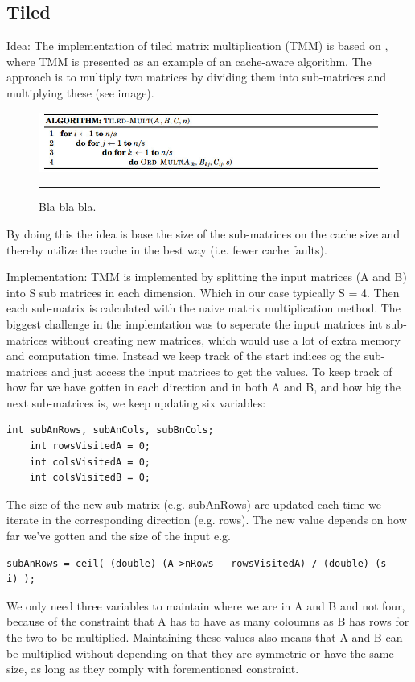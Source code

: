 \subsection{Tiled}
Idea:
The implementation of tiled matrix multiplication (TMM) is based on \citep{matrixMultiplication}, where TMM is presented as an example of an cache-aware algorithm. 
The approach is to multiply two matrices by dividing them into sub-matrices and multiplying these (see image). 
\begin{figure}[htbp]
	\centering
		\includegraphics[width=\textwidth]{./Figures/Project2a/TiledMulti_Pseudo.jpg}
		\rule{35em}{0.5pt}
	\caption[Branch misses]{
	Bla bla bla.
	}
	\label{fig:Branch_misses}
\end{figure}
By doing this the idea is base the size of the sub-matrices on the cache size and thereby utilize the cache in the best way (i.e. fewer cache faults).   

Implementation:
TMM is implemented by splitting the input matrices (A and B) into S sub matrices in each dimension. Which in our case typically S = 4. 
Then each sub-matrix is calculated with the naive matrix multiplication method. 
The biggest challenge in the implemtation was to seperate the input matrices int sub-matrices without creating new matrices, which would use a lot of extra memory and computation time. 
Instead we keep track of the start indices og the sub-matrices and just access the input matrices to get the values. 
To keep track of how far we have gotten in each direction and in both A and B, and how big the next sub-matrices is, we keep updating six variables:
\begin{verbatim}
int subAnRows, subAnCols, subBnCols;
	int rowsVisitedA = 0;
	int colsVisitedA = 0;
	int colsVisitedB = 0;
\end{verbatim}
The size of the new sub-matrix (e.g. subAnRows) are updated each time we iterate in the corresponding direction (e.g. rows). 
The new value depends on how far we've gotten and the size of the input e.g.
\begin{verbatim}
subAnRows = ceil( (double) (A->nRows - rowsVisitedA) / (double) (s - i) );
\end{verbatim}
We only need three variables to maintain where we are in A and B and not four, because of the constraint that A has to have as many coloumns as B has rows for the two to be multiplied. 
Maintaining these values also means that A and B can be multiplied without depending on that they are symmetric or have the same size, as long as they comply with forementioned constraint.



